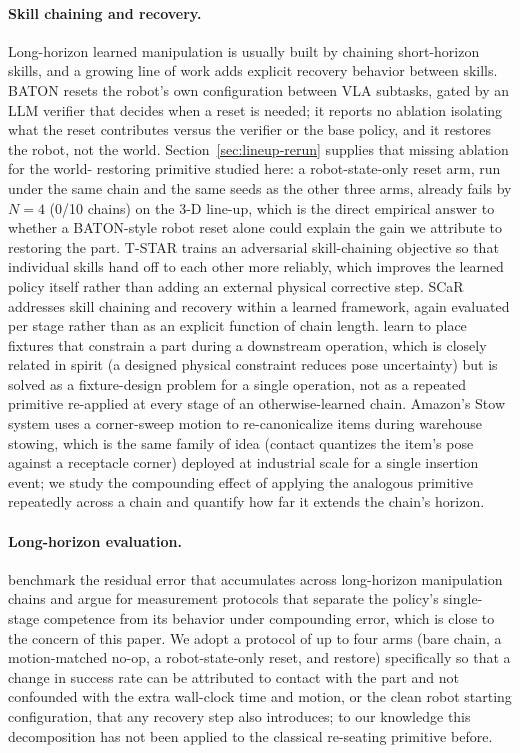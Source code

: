\documentclass[11pt]{article}
\begin{document}
\paragraph{Skill chaining and recovery.}
Long-horizon learned manipulation is usually built by chaining short-horizon
skills, and a growing line of work adds explicit recovery behavior between
skills. BATON \citep{baton2026} resets the robot's own configuration
between VLA subtasks, gated by an LLM verifier that decides when a reset is
needed; it reports no ablation isolating what the reset contributes versus
the verifier or the base policy, and it restores the robot, not the world.
Section~\ref{sec:lineup-rerun} supplies that missing ablation for the world-
restoring primitive studied here: a robot-state-only reset arm, run under
the same chain and the same seeds as the other three arms, already fails by
$N=4$ (0/10 chains) on the 3-D line-up, which is the direct empirical
answer to whether a BATON-style robot reset alone could explain the gain we
attribute to restoring the part.
T-STAR \citep{lee2021} trains an adversarial skill-chaining objective so
that individual skills hand off to each other more reliably, which improves
the learned policy itself rather than adding an external physical corrective
step. SCaR \citep{scar2024} addresses skill chaining and recovery within a
learned framework, again evaluated per stage rather than as an explicit
function of chain length. \citet{shao2020} learn to place fixtures that
constrain a part during a downstream operation, which is closely related in
spirit (a designed physical constraint reduces pose uncertainty) but is
solved as a fixture-design problem for a single operation, not as a repeated
primitive re-applied at every stage of an otherwise-learned chain. Amazon's
Stow system \citep{amazonstow2025} uses a corner-sweep motion to
re-canonicalize items during warehouse stowing, which is the same family of
idea (contact quantizes the item's pose against a receptacle corner)
deployed at industrial scale for a single insertion event; we study the
compounding effect of applying the analogous primitive repeatedly across a
chain and quantify how far it extends the chain's horizon.

\paragraph{Long-horizon evaluation.}
\citet{residual2025} benchmark the residual error that accumulates across
long-horizon manipulation chains and argue for measurement protocols that
separate the policy's single-stage competence from its behavior under
compounding error, which is close to the concern of this paper. We adopt a
protocol of up to four arms (bare chain, a motion-matched no-op, a
robot-state-only reset, and restore) specifically so that a change in
success rate can be attributed to contact with the part and not confounded
with the extra wall-clock time and motion, or the clean robot starting
configuration, that any recovery step also introduces; to our knowledge
this decomposition has not been applied to the classical re-seating
primitive before.
\end{document}
